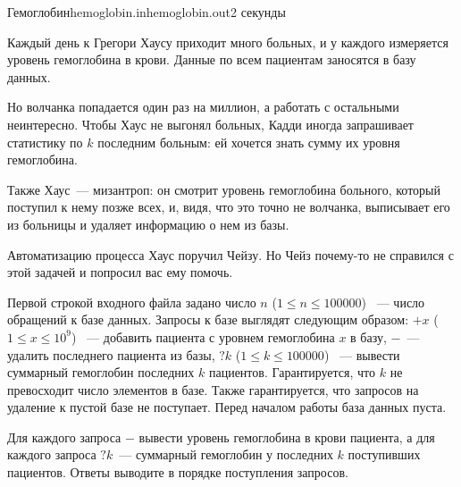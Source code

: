 \begin{problem}{Гемоглобин}{hemoglobin.in}{hemoglobin.out}{2 секунды}


Каждый день к Грегори Хаусу приходит много больных, и у каждого измеряется уровень гемоглобина в крови. Данные по всем пациентам заносятся в базу данных.

Но волчанка попадается один раз на миллион, а работать с остальными неинтересно.
Чтобы Хаус не выгонял больных, Кадди иногда запрашивает статистику по $k$ последним больным: 
ей хочется знать сумму их уровня гемоглобина.

Также Хаус~--- мизантроп: он смотрит уровень гемоглобина больного, 
который поступил к нему позже всех, и, видя, что это точно не волчанка, 
выписывает его из больницы и удаляет информацию о нем из базы.

Автоматизацию процесса Хаус поручил Чейзу. Но Чейз почему-то не справился с этой задачей и попросил вас ему помочь.  

\InputFile
Первой строкой входного файла задано число $n$ ($1 \le n \le 100000$) ~--- число обращений к базе данных.
Запросы к базе выглядят следующим образом: $+x$ ($1 \le x \le 10^9$) ~--- добавить пациента с уровнем гемоглобина $x$ в базу,
$-$~--- удалить последнего пациента из базы, $?k$ ($1 \le k \le 100000$) ~--- вывести суммарный гемоглобин последних $k$ пациентов. 
Гарантируется, что $k$ не превосходит число элементов в базе. 
Также гарантируется, что запросов на удаление к пустой базе не поступает.
Перед началом работы база данных пуста.

\OutputFile               
Для каждого запроса $-$ вывести уровень гемоглобина в крови пациента, 
а для каждого запроса $?k$~--- суммарный гемоглобин у последних $k$ поступивших пациентов. Ответы выводите в порядке поступления запросов.

\Examples
\begin{example}%
%
\end{example}
\end{problem}
